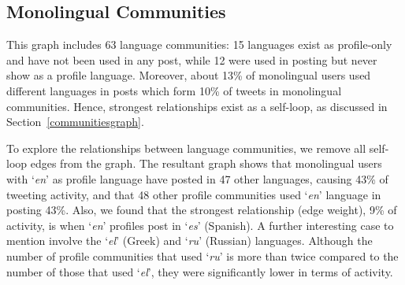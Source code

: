 \documentclass{llncs}
\begin{document}
\subsection{Monolingual Communities}

This graph includes 63 language communities: 15 languages exist as
profile-only and have not been used in any post, while 12 were used in
posting but never show as a profile language. Moreover, about 13\% of
monolingual users used different languages in posts which form 10\% of
tweets in monolingual communities. Hence, strongest relationships
exist as a self-loop, as discussed in
Section~\ref{communitiesgraph}.

To explore the relationships between language communities, we remove
all self-loop edges from the graph. The resultant graph shows that
monolingual users with `{\emph{en}}' as profile language have posted
in 47 other languages, causing 43\% of tweeting activity, and that 48
other profile communities used `{\emph{en}}' language in posting
43\%. Also, we found that the strongest relationship (edge weight),
9\% of activity, is when `{\emph{en}}' profiles post in `{\emph{es}}'
(Spanish). A further interesting case to mention involve the `\emph{el}'
(Greek) and `\emph{ru}' (Russian) languages. Although the number of
profile communities that used `\emph{ru}' is more than twice compared to
the number of those that used `\emph{el}', they were significantly lower
in terms of activity.


\end{document}
